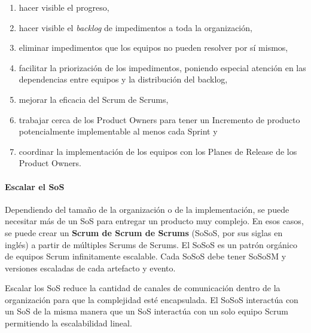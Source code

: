 \documentclass{article} %
\begin{document}
\begin{enumerate}
\item  hacer visible el  progreso,

\item  hacer visible el \textit{backlog }de impedimentos a toda la organizaci\'{o}n,

\item  eliminar impedimentos que los equipos no pueden resolver por s\'{i} mismos,

\item  facilitar la priorizaci\'{o}n de los impedimentos, poniendo especial atenci\'{o}n en las dependencias entre  equipos y la distribuci\'{o}n del backlog,

\item  mejorar la eficacia del Scrum de Scrums,

\item  trabajar cerca de los Product Owners para tener un Incremento de producto potencialmente implementable al menos cada Sprint y

\item  coordinar la implementaci\'{o}n de los equipos con los Planes de Release de los Product Owners.
\end{enumerate}

\noindent 
\paragraph{Escalar el SoS}

\noindent 

\noindent Dependiendo del tama\~{n}o de la organizaci\'{o}n o de la implementaci\'{o}n, se puede necesitar m\'{a}s de un SoS para entregar un producto muy complejo. En esos casos, se puede crear un \textbf{Scrum de Scrum de Scrums} (SoSoS, por sus siglas en ingl\'{e}s) a partir de m\'{u}ltiples Scrums de Scrums. El SoSoS es un patr\'{o}n org\'{a}nico de equipos Scrum infinitamente escalable. Cada SoSoS debe tener SoSoSM y versiones escaladas de cada artefacto y evento.

\noindent 

\noindent Escalar los SoS reduce la cantidad de canales de comunicaci\'{o}n dentro de la organizaci\'{o}n para que la complejidad est\'{e} encapsulada. El SoSoS interact\'{u}a con un SoS de la misma manera que un SoS interact\'{u}a con un solo equipo Scrum permitiendo la escalabilidad lineal.

\noindent 

\noindent 
\end{document}
